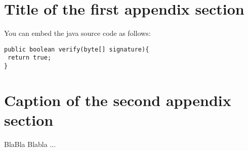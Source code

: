 \section{Title of the first appendix section}
\label{sec:a-1}
You can embed the java source code as follows:

\lstset{language=java}
\begin{lstlisting}
public boolean verify(byte[] signature){
 return true;
}
\end{lstlisting}

\section{Caption of the second appendix section}
\label{sec:a-2}
BlaBla Blabla ...


